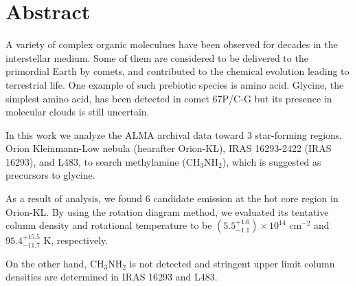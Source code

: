 \chapter*{Abstract}

\singlespacing
\doublespacing

A variety of complex organic moleculues have been observed for decades in the interstellar medium.
Some of them are considered to be delivered to the primordial Earth by comets, 
and contributed to the chemical evolution leading to terrestrial life.
One example of such prebiotic species is amino acid. Glycine, the simplest amino acid, 
has been detected in comet 67P/C-G but its presence in molecular clouds is still uncertain.

In this work we analyze the ALMA archival data toward 3 star-forming regions, 
Orion Kleinmann-Low nebula (hearafter Orion-KL), IRAS 16293-2422 (IRAS 16293), and L483,
to search methylamine (CH$_3$NH$_2$), which is suggested as precursors to glycine. 

As a result of analysis, we found 6 candidate emission at the hot core region in Orion-KL.
By using the rotation diagram method, we evaluated its tentative column density 
and rotational temperature to be $(5.5^{+1.6}_{-1.1} ) \times 10^{14}$ cm$^{-2}$ and $95.4^{+15.5}_{-11.7} \,\,\mathrm{K}$, respectively. 

On the other hand, CH$_3$NH$_2$ is not detected and stringent upper limit column densities
are determined in IRAS 16293 and L483.

